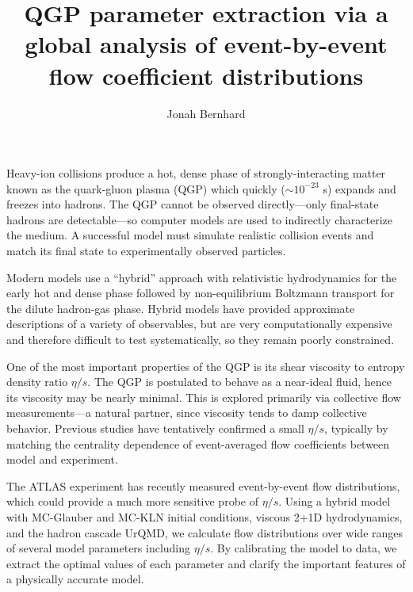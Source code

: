 \documentclass[letterpaper,10pt]{article}
\title{QGP parameter extraction via a global analysis of event-by-event flow coefficient distributions}
\author{Jonah Bernhard}
\begin{document}
\maketitle


\noindent Heavy-ion collisions produce a hot, dense phase of strongly-interacting matter known as the quark-gluon plasma (QGP) which quickly
($\sim 10^{-23}$ s) expands and freezes into hadrons.  The QGP cannot be observed directly---only final-state hadrons are detectable---so
computer models are used to indirectly characterize the medium.  A successful model must simulate realistic collision events and match its
final state to experimentally observed particles.

Modern models use a ``hybrid'' approach with relativistic hydrodynamics for the early hot and dense phase followed by non-equilibrium
Boltzmann transport for the dilute hadron-gas phase.  Hybrid models have provided approximate descriptions of a variety of observables, but are
very computationally expensive and therefore difficult to test systematically, so they remain poorly constrained.

One of the most important properties of the QGP is its shear viscosity to entropy density ratio $\eta/s$.  The QGP is postulated to behave
as a near-ideal fluid, hence its viscosity may be nearly minimal.  This is explored primarily via collective flow measurements---a natural
partner, since viscosity tends to damp collective behavior.  Previous studies have tentatively confirmed a small $\eta/s$, typically by
matching the centrality dependence of event-averaged flow coefficients between model and experiment.

The ATLAS experiment has recently measured event-by-event flow distributions, which could provide a much more sensitive probe
of $\eta/s$.  Using a hybrid model with MC-Glauber and MC-KLN initial conditions, viscous 2+1D hydrodynamics, and the hadron cascade UrQMD,
we calculate flow distributions over wide ranges of several model parameters including $\eta/s$.  By calibrating the model to data, we
extract the optimal values of each parameter and clarify the important features of a physically accurate model.
\end{document}
